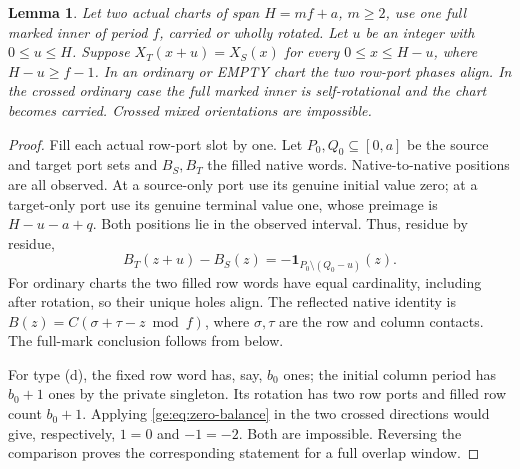 \documentclass[11pt,a4paper]{amsart}
\numberwithin{equation}{section}
\theoremstyle{plain}
\newtheorem{lemma}[theorem]{Lemma}
\theoremstyle{definition}
\newcommand{\one}{\mathbf1}
\begin{document}
\begin{lemma}\label{ge:zero-port}
Let two actual charts of span \(H=mf+a\), \(m\ge2\), use one full marked
inner of period \(f\), carried or wholly rotated.  Let \(u\) be an
integer with \(0\le u\le H\).  Suppose
\(X_T(x+u)=X_S(x)\) for every \(0\le x\le H-u\), where
\(H-u\ge f-1\).  In an ordinary or EMPTY chart the two row-port phases
align.  In the crossed ordinary case the full marked inner is
self-rotational and the chart becomes carried.  Crossed mixed orientations
are impossible.
\end{lemma}
\begin{proof}
Fill each actual row-port slot by one.  Let \(P_0,Q_0\subseteq[0,a]\)
be the source and target port sets and \(B_S,B_T\) the filled native
words.  Native-to-native positions are all observed.  At a source-only
port use its genuine initial value zero; at a target-only port use its
genuine terminal value one, whose preimage is \(H-u-a+q\).  Both
positions lie in the observed interval.  Thus, residue by residue,
\begin{equation}\label{ge:eq:zero-balance}
 B_T(z+u)-B_S(z)=-\one_{P_0\setminus(Q_0-u)}(z).
\end{equation}
For ordinary charts the two filled row words have equal cardinality,
including after rotation, so their unique holes align.  The reflected
native identity is
\(B(z)=C(\sigma+\tau-z\bmod f)\), where \(\sigma,\tau\) are the
row and column contacts.  The full-mark conclusion follows from
 below.

For type (d), the fixed row word has, say, \(b_0\) ones; the initial
column period has \(b_0+1\) ones by the private singleton.  Its rotation
has two row ports and filled row count \(b_0+1\).  Applying
\eqref{ge:eq:zero-balance} in the two crossed directions would give,
respectively, \(1=0\) and \(-1=-2\).  Both are impossible.  Reversing
the comparison proves the corresponding statement for a full overlap
window.
\end{proof}
\end{document}
